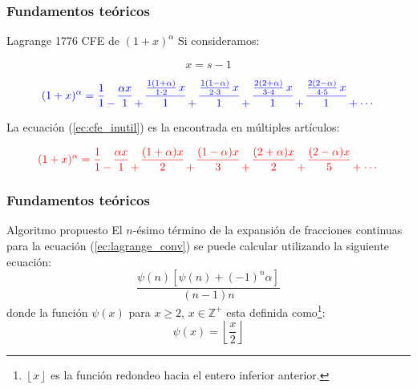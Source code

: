 \documentclass[10pt]{beamer}
\begin{document}
	\begin{frame}
		\frametitle{Fundamentos teóricos}
		\begin{block}{Lagrange 1776 CFE de $(1 + x)^{\alpha}$}
		Si consideramos:
			\begin{scriptsize}
				\begin{equation}
					x = s-1
				\end{equation}
			\end{scriptsize}
			\begin{scriptsize}
				\begin{equation}
				{\color{blue} 
		 			(1 + x)^{\alpha} = \frac{1}{1} \genfrac{}{}{0pt}{0}{}{-} \frac{\alpha x}{1} \genfrac{}{}{0pt}{0}{}{+} \frac{\frac{1(1 + \alpha)}{1\cdot2}\,x}{1} \genfrac{}{}{0pt}{0}{}{+} \frac{\frac{1(1 - \alpha)}{2\cdot3}\,x}{1} \genfrac{}{}{0pt}{0}{}{+} \frac{\frac{2(2 + \alpha)}{3\cdot4}\,x}{1} \genfrac{}{}{0pt}{0}{}{+} \frac{\frac{2(2 - \alpha)}{4\cdot5}\,x}{1} \genfrac{}{}{0pt}{0}{}{+} \genfrac{}{}{0pt}{0}{}{\cdots} }
				\label{ec:lagrange_conv}
				\end{equation}
			\end{scriptsize}	
			
		La ecuación (\ref{ec:cfe_inutil}) es la encontrada en múltiples artículos:
			\begin{scriptsize}
				\begin{equation}
				{\color{red} 
			 		(1 + x)^{\alpha} = \frac{1}{1}  \genfrac{}{}{0pt}{0}{}{-} \frac{\alpha x}{1} \genfrac{}{}{0pt}{0}{}{+} \frac{(1 + \alpha)x}{2} \genfrac{}{}{0pt}{0}{}{+} \frac{(1 - \alpha)x}{3} \genfrac{}{}{0pt}{0}{}{+} \frac{(2 + \alpha)x}{2} \genfrac{}{}{0pt}{0}{}{+} \frac{(2-\alpha)x}{5} \genfrac{}{}{0pt}{0}{}{+} \genfrac{}{}{0pt}{0}{}{\cdots} }
			 		\label{ec:cfe_inutil}
				\end{equation}
			\end{scriptsize}	
		\end{block}
	\end{frame}
	\begin{frame}
		\frametitle{Fundamentos teóricos}
		\begin{block}{Algoritmo propuesto}
		\justifying
		El $n$-ésimo término de la expansión de fracciones continuas para la ecuación (\ref{ec:lagrange_conv}) se puede calcular utilizando la siguiente ecuación:
			\begin{equation}
				\frac{\psi(n) \left[ \psi(n) + (-1)^{n} \alpha \right]}{(n-1)n}
				\label{ec:calculo_terminos_cfe}
			\end{equation}
	donde la función $\psi(x)$ para $x\geq2$, $x\in \mathbb{Z}^{+}$ esta definida como\footnote{$\left\lfloor x\right\rfloor$ es  la función redondeo hacia el entero inferior anterior.}:
				\begin{equation}
					\psi(x) = \left\lfloor \frac{x}{2}\right\rfloor
				\end{equation}
		\end{block}
	\end{frame}		
\end{document}
